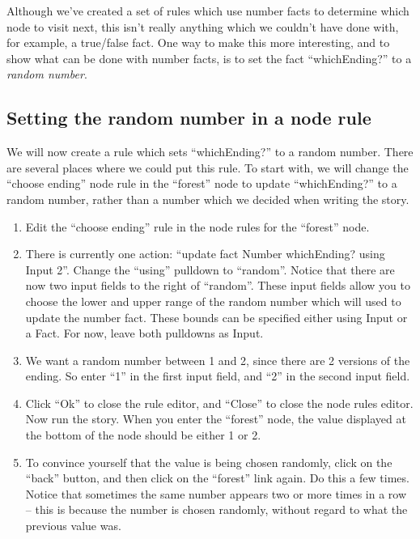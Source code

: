 \documentclass{article}
\begin{document}
Although we've created a set of rules which use number facts to 
determine which node to visit next, this isn't really anything which 
we couldn't have done with, for example, a true\slash false fact. One way 
to make this more interesting, and to show what can be done with 
number facts, is to set the fact ``whichEnding?'' to a \textit{random 
number}. 

\subsection{Setting the random number in a node rule}

We will now create a rule which sets ``whichEnding?'' to a random 
number. There are several places where we could put this rule. To 
start with, we will change the ``choose ending'' node rule in the 
``forest'' node to update ``whichEnding?'' to a random number, rather 
than a number which we decided when writing the story.

\begin{enumerate}
    \item Edit the ``choose ending'' rule in the node rules for the 
    ``forest'' node.
    \item There is currently one action: ``update fact Number 
    whichEnding? using Input 2''. Change the ``using'' pulldown to 
    ``random''. Notice that there are now two input fields to the 
    right of ``random''. These input fields allow you 
    to choose the lower and upper range of the random number which 
    will used to update the number fact. These bounds can be 
    specified either using Input or a Fact. For now, leave both 
    pulldowns as Input.
    \item We want a random number between 1 and 2, since there are 2 
    versions of the ending. So enter ``1'' in the first input field, 
    and ``2'' in the second input field. 
    \item Click ``Ok'' to close the rule editor, and ``Close'' to 
    close the node rules editor. Now run the story. When you enter 
    the ``forest'' node, the value displayed at the bottom of the 
    node should be either 1 or 2.
    \item To convince yourself that the value is being chosen 
    randomly, click on the ``back'' button, and then click on the 
    ``forest'' link again. Do this a few times. Notice that sometimes 
    the same number appears two or more times in a row -- this is 
    because the number is chosen randomly, without regard to what the 
    previous value was. 
\end{enumerate}
\end{document}
